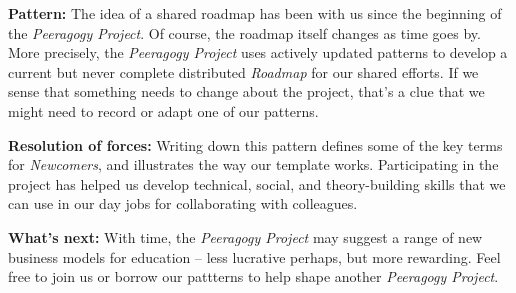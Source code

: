 \textbf{Pattern:}
The idea of a shared roadmap has been with us since the beginning of the \emph{Peeragogy Project}.  Of course, the roadmap itself changes as time goes by.  More precisely, the \emph{Peeragogy Project} uses actively updated patterns to develop a current but never complete distributed \emph{Roadmap} for our shared efforts.  If we sense that something needs to  change about the project, that’s a clue that we might need to record or adapt one of our patterns. 

\textbf{Resolution of forces:}  
Writing down this pattern defines some of the key terms for \emph{Newcomers}, and illustrates the way our template works.  Participating in the project has helped us develop technical, social, and theory-building skills that we can use in our day jobs for collaborating with colleagues.

\textbf{What's next:} 
With time, the \emph{Peeragogy Project} may suggest a range of new business models for education -- less lucrative perhaps, but more rewarding.  Feel free to join us or borrow our pattterns to help shape another \emph{Peeragogy Project}.